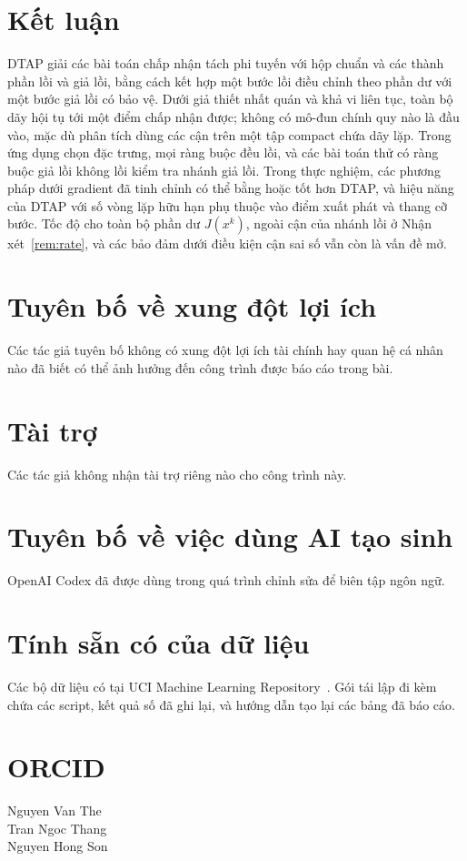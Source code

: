 \section{Kết luận}\label{sec:conclusion}
DTAP giải các bài toán chấp nhận tách phi tuyến với hộp chuẩn và các thành phần lồi và giả lồi, bằng cách kết hợp một bước lồi điều chỉnh theo phần dư với một bước giả lồi có bảo vệ. Dưới giả thiết nhất quán và khả vi liên tục, toàn bộ dãy hội tụ tới một điểm chấp nhận được; không có mô-đun chính quy nào là đầu vào, mặc dù phân tích dùng các cận trên một tập compact chứa dãy lặp. Trong ứng dụng chọn đặc trưng, mọi ràng buộc đều lồi, và các bài toán thử có ràng buộc giả lồi không lồi kiểm tra nhánh giả lồi. Trong thực nghiệm, các phương pháp dưới gradient đã tinh chỉnh có thể bằng hoặc tốt hơn DTAP, và hiệu năng của DTAP với số vòng lặp hữu hạn phụ thuộc vào điểm xuất phát và thang cỡ bước. Tốc độ cho toàn bộ phần dư $J(x^k)$, ngoài cận của nhánh lồi ở Nhận xét~\ref{rem:rate}, và các bảo đảm dưới điều kiện cận sai số vẫn còn là vấn đề mở.

\section*{Tuyên bố về xung đột lợi ích}
Các tác giả tuyên bố không có xung đột lợi ích tài chính hay quan hệ cá nhân nào đã biết có thể ảnh hưởng đến công trình được báo cáo trong bài.
\section*{Tài trợ}
Các tác giả không nhận tài trợ riêng nào cho công trình này.
\section*{Tuyên bố về việc dùng AI tạo sinh}
OpenAI Codex đã được dùng trong quá trình chỉnh sửa để biên tập ngôn ngữ.
\section*{Tính sẵn có của dữ liệu}
Các bộ dữ liệu có tại UCI Machine Learning Repository~\citep{kelly2023uci}. Gói tái lập đi kèm chứa các script, kết quả số đã ghi lại, và hướng dẫn tạo lại các bảng đã báo cáo.

\section*{ORCID}
\noindent Nguyen Van The~\\
Tran Ngoc Thang~\\
Nguyen Hong Son~


